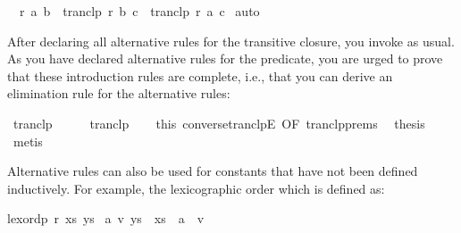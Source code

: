 \begin{isabellebody}
\ \ {}r\ a\ b\ {}\ tranclp\ r\ b\ c\ {}\ tranclp\ r\ a\ c{}\isanewline
{}\isamarkupfalse%
\ auto%
\endisatagquote
{\isafoldquote}%
%
\isadelimquote
%
\endisadelimquote
%
\begin{isamarkuptext}%
\noindent After declaring all alternative rules for the transitive
  closure, you invoke \hyperlink{command.code-pred}{\mbox{}} as usual.  As you have
  declared alternative rules for the predicate, you are urged to prove
  that these introduction rules are complete, i.e., that you can
  derive an elimination rule for the alternative rules:%
\end{isamarkuptext}%
\isamarkuptrue%
%
\isadelimquote
%
\endisadelimquote
%
\isatagquote
{}\isamarkupfalse%
\ tranclp\isanewline
{}\isamarkupfalse%
\ {}\isanewline
\ \ \isamarkupfalse%
\ tranclp\isanewline
\ \ \isamarkupfalse%
\ this\ converse{}tranclpE\ {}OF\ tranclp{}prems{}\ \isamarkupfalse%
\ thesis\ \isamarkupfalse%
\ metis\isanewline
{}\isamarkupfalse%
%
\endisatagquote
{\isafoldquote}%
%
\isadelimquote
%
\endisadelimquote
%
\begin{isamarkuptext}%
\noindent Alternative rules can also be used for constants that have
  not been defined inductively. For example, the lexicographic order
  which is defined as:%
\end{isamarkuptext}%
\isamarkuptrue%
%
\isadelimquote
%
\endisadelimquote
%
\isatagquote
%
\begin{isamarkuptext}%
\begin{isabelle}%
lexordp\ r\ {}xs\ {}ys\ {}\isanewline
{}{}a\ v{}\ {}ys\ {}\ {}xs\ {}\ a\ {}\ v\ {}\isanewline

\end{isabelle}
\end{isamarkuptext}
\end{isabellebody}
